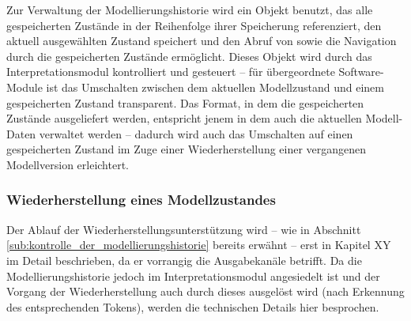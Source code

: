 Zur Verwaltung der Modellierungshistorie wird ein Objekt benutzt, das alle gespeicherten Zustände in der Reihenfolge ihrer Speicherung referenziert, den aktuell ausgewählten Zustand speichert und den Abruf von sowie die Navigation durch die gespeicherten Zustände ermöglicht. Dieses Objekt wird durch das Interpretationsmodul kontrolliert und gesteuert -- für übergeordnete Software-Module ist das Umschalten zwischen dem aktuellen Modellzustand und einem gespeicherten Zustand transparent. Das Format, in dem die gespeicherten Zustände ausgeliefert werden, entspricht jenem in dem auch die aktuellen Modell-Daten verwaltet werden -- dadurch wird auch das Umschalten auf einen gespeicherten Zustand im Zuge einer Wiederherstellung einer vergangenen Modellversion erleichtert.

\subsubsection{Wiederherstellung eines Modellzustandes} %
\label{ssub:wiederherstellung_eines_modellzustandes}

Der Ablauf der Wiederherstellungsunterstützung wird -- wie in Abschnitt \ref{sub:kontrolle_der_modellierungshistorie} bereits erwähnt -- erst in Kapitel XY im Detail beschrieben, da er vorrangig die Ausgabekanäle betrifft. Da die Modellierungshistorie jedoch im Interpretationsmodul angesiedelt ist und der Vorgang der Wiederherstellung auch durch dieses ausgelöst wird (nach Erkennung des entsprechenden Tokens), werden die technischen Details hier besprochen. 

